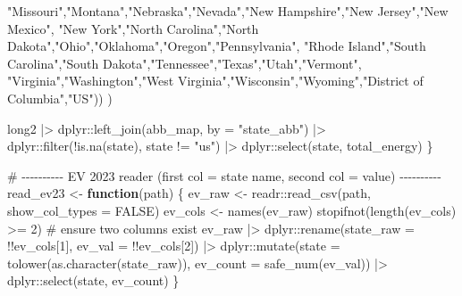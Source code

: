 \documentclass[
  english,
  letterpaper,
  DIV=11,
  numbers=noendperiod]{scrartcl}
\newenvironment{Shaded}{\begin{snugshade}}{\end{snugshade}}
\newcommand{\AttributeTok}[1]{\textcolor[rgb]{0.40,0.45,0.13}{#1}}
\newcommand{\CommentTok}[1]{\textcolor[rgb]{0.37,0.37,0.37}{#1}}
\newcommand{\ConstantTok}[1]{\textcolor[rgb]{0.56,0.35,0.01}{#1}}
\newcommand{\ControlFlowTok}[1]{\textcolor[rgb]{0.00,0.23,0.31}{\textbf{#1}}}
\newcommand{\DecValTok}[1]{\textcolor[rgb]{0.68,0.00,0.00}{#1}}
\newcommand{\FunctionTok}[1]{\textcolor[rgb]{0.28,0.35,0.67}{#1}}
\newcommand{\NormalTok}[1]{\textcolor[rgb]{0.00,0.23,0.31}{#1}}
\newcommand{\OtherTok}[1]{\textcolor[rgb]{0.00,0.23,0.31}{#1}}
\newcommand{\SpecialCharTok}[1]{\textcolor[rgb]{0.37,0.37,0.37}{#1}}
\newcommand{\StringTok}[1]{\textcolor[rgb]{0.13,0.47,0.30}{#1}}
\begin{document}
\begin{Shaded}
\begin{Highlighting}[]
      \StringTok{"Missouri"}\NormalTok{,}\StringTok{"Montana"}\NormalTok{,}\StringTok{"Nebraska"}\NormalTok{,}\StringTok{"Nevada"}\NormalTok{,}\StringTok{"New Hampshire"}\NormalTok{,}\StringTok{"New Jersey"}\NormalTok{,}\StringTok{"New Mexico"}\NormalTok{,}
      \StringTok{"New York"}\NormalTok{,}\StringTok{"North Carolina"}\NormalTok{,}\StringTok{"North Dakota"}\NormalTok{,}\StringTok{"Ohio"}\NormalTok{,}\StringTok{"Oklahoma"}\NormalTok{,}\StringTok{"Oregon"}\NormalTok{,}\StringTok{"Pennsylvania"}\NormalTok{,}
      \StringTok{"Rhode Island"}\NormalTok{,}\StringTok{"South Carolina"}\NormalTok{,}\StringTok{"South Dakota"}\NormalTok{,}\StringTok{"Tennessee"}\NormalTok{,}\StringTok{"Texas"}\NormalTok{,}\StringTok{"Utah"}\NormalTok{,}\StringTok{"Vermont"}\NormalTok{,}
      \StringTok{"Virginia"}\NormalTok{,}\StringTok{"Washington"}\NormalTok{,}\StringTok{"West Virginia"}\NormalTok{,}\StringTok{"Wisconsin"}\NormalTok{,}\StringTok{"Wyoming"}\NormalTok{,}\StringTok{"District of Columbia"}\NormalTok{,}\StringTok{"US"}\NormalTok{))}
\NormalTok{  )}

\NormalTok{  long2 }\SpecialCharTok{|\textgreater{}}
\NormalTok{    dplyr}\SpecialCharTok{::}\FunctionTok{left\_join}\NormalTok{(abb\_map, }\AttributeTok{by =} \StringTok{"state\_abb"}\NormalTok{) }\SpecialCharTok{|\textgreater{}}
\NormalTok{    dplyr}\SpecialCharTok{::}\FunctionTok{filter}\NormalTok{(}\SpecialCharTok{!}\FunctionTok{is.na}\NormalTok{(state), state }\SpecialCharTok{!=} \StringTok{"us"}\NormalTok{) }\SpecialCharTok{|\textgreater{}}
\NormalTok{    dplyr}\SpecialCharTok{::}\FunctionTok{select}\NormalTok{(state, total\_energy)}
\NormalTok{\}}

\CommentTok{\# {-}{-}{-}{-}{-}{-}{-}{-}{-}{-} EV 2023 reader (first col = state name, second col = value) {-}{-}{-}{-}{-}{-}{-}{-}{-}{-}}
\NormalTok{read\_ev23 }\OtherTok{\textless{}{-}} \ControlFlowTok{function}\NormalTok{(path) \{}
\NormalTok{  ev\_raw }\OtherTok{\textless{}{-}}\NormalTok{ readr}\SpecialCharTok{::}\FunctionTok{read\_csv}\NormalTok{(path, }\AttributeTok{show\_col\_types =} \ConstantTok{FALSE}\NormalTok{)}
\NormalTok{  ev\_cols }\OtherTok{\textless{}{-}} \FunctionTok{names}\NormalTok{(ev\_raw)}
  \FunctionTok{stopifnot}\NormalTok{(}\FunctionTok{length}\NormalTok{(ev\_cols) }\SpecialCharTok{\textgreater{}=} \DecValTok{2}\NormalTok{)  }\CommentTok{\# ensure two columns exist}
\NormalTok{  ev\_raw }\SpecialCharTok{|\textgreater{}}
\NormalTok{    dplyr}\SpecialCharTok{::}\FunctionTok{rename}\NormalTok{(}\AttributeTok{state\_raw =} \SpecialCharTok{!!}\NormalTok{ev\_cols[}\DecValTok{1}\NormalTok{], }\AttributeTok{ev\_val =} \SpecialCharTok{!!}\NormalTok{ev\_cols[}\DecValTok{2}\NormalTok{]) }\SpecialCharTok{|\textgreater{}}
\NormalTok{    dplyr}\SpecialCharTok{::}\FunctionTok{mutate}\NormalTok{(}\AttributeTok{state =} \FunctionTok{tolower}\NormalTok{(}\FunctionTok{as.character}\NormalTok{(state\_raw)),}
                  \AttributeTok{ev\_count =} \FunctionTok{safe\_num}\NormalTok{(ev\_val)) }\SpecialCharTok{|\textgreater{}}
\NormalTok{    dplyr}\SpecialCharTok{::}\FunctionTok{select}\NormalTok{(state, ev\_count)}
\NormalTok{\}}


\end{Highlighting}
\end{Shaded}
\end{document}
